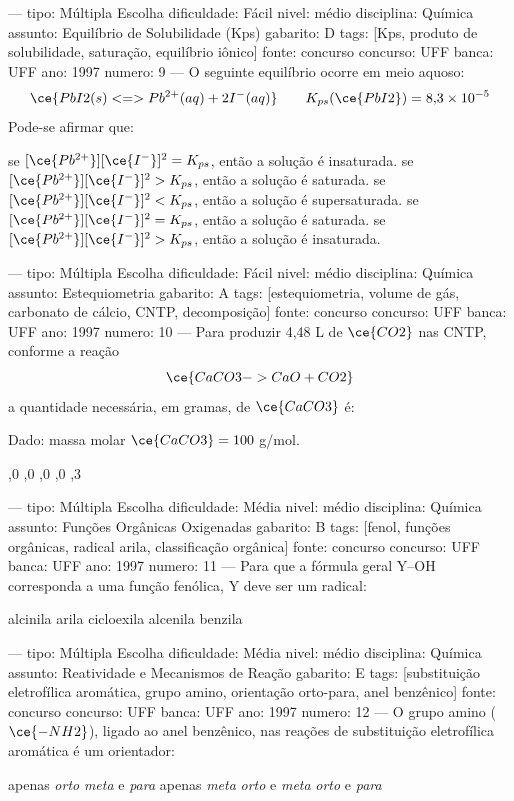 ---
tipo: Múltipla Escolha
dificuldade: Fácil
nivel: médio
disciplina: Química
assunto: Equilíbrio de Solubilidade (Kps)
gabarito: D
tags: [Kps, produto de solubilidade, saturação, equilíbrio iônico]
fonte: concurso
concurso: UFF
banca: UFF
ano: 1997
numero: 9
---
\question
O seguinte equilíbrio ocorre em meio aquoso:
$$\ce{PbI2(s) <=> Pb^{2+}(aq) + 2 I^{-}(aq)} \qquad K_{ps}(\ce{PbI2}) = 8{,}3 \times 10^{-5}$$
Pode-se afirmar que:
\begin{choices}
\choice se $[\ce{Pb^{2+}}][\ce{I^{-}}]^2 = K_{ps}$, então a solução é insaturada.
\choice se $[\ce{Pb^{2+}}][\ce{I^{-}}]^2 > K_{ps}$, então a solução é saturada.
\choice se $[\ce{Pb^{2+}}][\ce{I^{-}}]^2 < K_{ps}$, então a solução é supersaturada.
\CorrectChoice se $[\ce{Pb^{2+}}][\ce{I^{-}}]^2 = K_{ps}$, então a solução é saturada.
\choice se $[\ce{Pb^{2+}}][\ce{I^{-}}]^2 > K_{ps}$, então a solução é insaturada.
\end{choices}

---
tipo: Múltipla Escolha
dificuldade: Fácil
nivel: médio
disciplina: Química
assunto: Estequiometria
gabarito: A
tags: [estequiometria, volume de gás, carbonato de cálcio, CNTP, decomposição]
fonte: concurso
concurso: UFF
banca: UFF
ano: 1997
numero: 10
---
\question
Para produzir 4,48 L de $\ce{CO2}$ nas CNTP, conforme a reação
$$\ce{CaCO3 -> CaO + CO2}$$
a quantidade necessária, em gramas, de $\ce{CaCO3}$ é:

Dado: massa molar $\ce{CaCO3} = 100$ g/mol.
\begin{choices}
,0
,0
,0
,0
,3
\end{choices}

---
tipo: Múltipla Escolha
dificuldade: Média
nivel: médio
disciplina: Química
assunto: Funções Orgânicas Oxigenadas
gabarito: B
tags: [fenol, funções orgânicas, radical arila, classificação orgânica]
fonte: concurso
concurso: UFF
banca: UFF
ano: 1997
numero: 11
---
\question
Para que a fórmula geral $\text{Y--OH}$ corresponda a uma função fenólica, $\text{Y}$ deve ser um radical:
\begin{choices}
\choice alcinila
\CorrectChoice arila
\choice cicloexila
\choice alcenila
\choice benzila
\end{choices}

---
tipo: Múltipla Escolha
dificuldade: Média
nivel: médio
disciplina: Química
assunto: Reatividade e Mecanismos de Reação
gabarito: E
tags: [substituição eletrofílica aromática, grupo amino, orientação orto-para, anel benzênico]
fonte: concurso
concurso: UFF
banca: UFF
ano: 1997
numero: 12
---
\question
O grupo amino ($\ce{-NH2}$), ligado ao anel benzênico, nas reações de substituição eletrofílica aromática é um orientador:
\begin{choices}
\choice apenas \textit{orto}
\choice \textit{meta} e \textit{para}
\choice apenas \textit{meta}
\choice \textit{orto} e \textit{meta}
\CorrectChoice \textit{orto} e \textit{para}
\end{choices}

